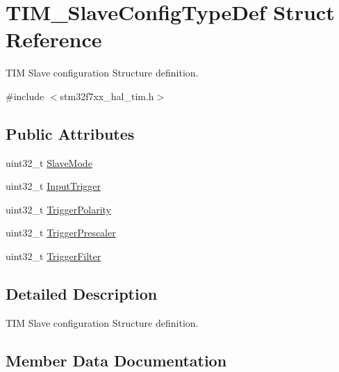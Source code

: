 \hypertarget{struct_t_i_m___slave_config_type_def}{}\section{T\+I\+M\+\_\+\+Slave\+Config\+Type\+Def Struct Reference}
\label{struct_t_i_m___slave_config_type_def}


T\+IM Slave configuration Structure definition.  




{\ttfamily \#include $<$stm32f7xx\+\_\+hal\+\_\+tim.\+h$>$}

\subsection*{Public Attributes}
\begin{DoxyCompactItemize}
\item 
uint32\+\_\+t \mbox{\hyperlink{struct_t_i_m___slave_config_type_def_a2792de155698128ade1e505618c1bc43}{Slave\+Mode}}
\item 
uint32\+\_\+t \mbox{\hyperlink{struct_t_i_m___slave_config_type_def_a82efdad1e2ed9edbd4c895987ebfe0f7}{Input\+Trigger}}
\item 
uint32\+\_\+t \mbox{\hyperlink{struct_t_i_m___slave_config_type_def_afa8fa1801ef5e13115732a495ef11165}{Trigger\+Polarity}}
\item 
uint32\+\_\+t \mbox{\hyperlink{struct_t_i_m___slave_config_type_def_a57be6d41d77a968f1daeac7b65b1ab4c}{Trigger\+Prescaler}}
\item 
uint32\+\_\+t \mbox{\hyperlink{struct_t_i_m___slave_config_type_def_a07d28f704576a41e37bbb7412e0fba60}{Trigger\+Filter}}
\end{DoxyCompactItemize}


\subsection{Detailed Description}
T\+IM Slave configuration Structure definition. 

\subsection{Member Data Documentation}
\mbox{\label{struct_t_i_m___slave_config_type_def_a82efdad1e2ed9edbd4c895987ebfe0f7}} 
